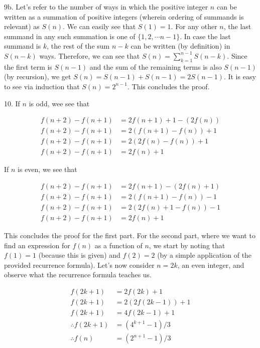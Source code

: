 \documentclass{article}
\begin{document}
9b. Let's refer to the number of ways in which the positive integer $n$ can be written as a summation of positive integers (wherein ordering of summands is relevant) as $S(n)$. We can easily see that $S(1) = 1$. For any other $n$, the last summand in any such summation is one of $\{1, 2, \cdots n - 1\}$. In case the last summand is $k$, the rest of the sum $n - k$ can be written (by definition) in $S(n - k)$ ways. Therefore, we can see that $S(n) = \sum_{k = 1}^{n - 1} S(n - k)$. Since the first term is $S(n - 1)$ and the sum of the remaining terms is also $S(n - 1)$ (by recursion), we get $S(n) = S(n - 1) + S(n - 1) = 2S(n - 1)$. It is easy to see via induction that $S(n) = 2^{n - 1}$. This concludes the proof.

10. If $n$ is odd, wee see that

\begin{align*}
    f(n + 2) - f(n + 1) &= 2f(n + 1) + 1 - (2f(n)) \\
    f(n + 2) - f(n + 1) &= 2(f(n + 1) - f(n)) + 1 \\
    f(n + 2) - f(n + 1) &= 2(2f(n) - f(n)) + 1 \\
    f(n + 2) - f(n + 1) &= 2f(n) + 1
\end{align*}

If $n$ is even, we see that

\begin{align*}
    f(n + 2) - f(n + 1) &= 2f(n + 1) - (2f(n) + 1) \\
    f(n + 2) - f(n + 1) &= 2(f(n + 1) - f(n)) - 1 \\
    f(n + 2) - f(n + 1) &= 2(2f(n) + 1 - f(n)) - 1 \\
    f(n + 2) - f(n + 1) &= 2f(n) + 1
\end{align*}

This concludes the proof for the first part. For the second part, where we want to find an expression for $f(n)$ as a function of $n$, we start by noting that $f(1) = 1$ (because this is given) and $f(2) = 2$ (by a simple application of the provided recurrence formula). Let's now consider $n = 2k$, an even integer, and observe what the recurrence formula teaches us.

\begin{align*}
    f(2k + 1) &= 2f(2k) + 1 \\
    f(2k + 1) &= 2(2f(2k - 1)) + 1 \\
    f(2k + 1) &= 4f(2k - 1) + 1 \\
    \therefore f(2k + 1) &= (4^{k + 1} - 1) / 3 \\
    \therefore f(n) &= (2^{n + 1} - 1) / 3
\end{align*}
\end{document}
